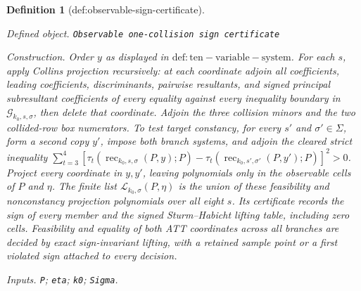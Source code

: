 \documentclass{article}
\newtheorem{definition}{Definition}
\begin{document}
\begin{definition}[def:observable-sign-certificate]\label{def:observable-sign-certificate}
\par\smallskip\noindent\emph{Defined object.} \texttt{Observable one-\allowbreak{}collision sign certificate}
\par\smallskip\noindent\emph{Construction.} Order \(y\) as displayed in \(\mathrm{def:ten-variable-system}\). For each \(s\), apply Collins projection recursively: at each coordinate adjoin all coefficients, leading coefficients, discriminants, pairwise resultants, and signed principal subresultant coefficients of every equality against every inequality boundary in \(\mathscr G_{k_0,s,\sigma}\), then delete that coordinate. Adjoin the three collision minors and the two collided-row box numerators. To test target constancy, for every \(s'\) and \(\sigma'\in\Sigma\), form a second copy \(y'\), impose both branch systems, and adjoin the cleared strict inequality \(\sum_{t=3}^{4}[\tau_t(\operatorname{rec}_{k_0,s,\sigma}(P,y);P)-\tau_t(\operatorname{rec}_{k_0,s',\sigma'}(P,y');P)]^2>0\). Project every coordinate in \(y,y'\), leaving polynomials only in the observable cells of \(P\) and \(\eta\). The finite list \(\mathscr L_{k_0,\sigma}(P,\eta)\) is the union of these feasibility and nonconstancy projection polynomials over all eight \(s\). Its certificate records the sign of every member and the signed Sturm--Habicht lifting table, including zero cells. Feasibility and equality of both ATT coordinates across all branches are decided by exact sign-invariant lifting, with a retained sample point or a first violated sign attached to every decision.
\par\smallskip\noindent\emph{Inputs.} \texttt{P}; \texttt{eta}; \texttt{k0}; \texttt{Sigma}.
\end{definition}
\end{document}
